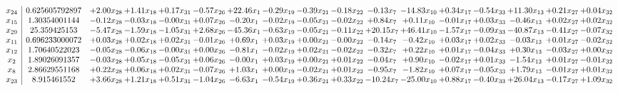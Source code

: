 \documentclass[9pt]{article}
\begin{document}
 \[\begin{array}{c| c c@{\hskip 2pt} c@{\hskip 2pt} c@{\hskip 2pt} c@{\hskip 2pt} c@{\hskip 2pt} c@{\hskip 2pt} c@{\hskip 2pt} c@{\hskip 2pt} c@{\hskip 2pt} c@{\hskip 2pt} c@{\hskip 2pt} c@{\hskip 2pt} c@{\hskip 2pt} c@{\hskip 2pt} c@{\hskip 2pt} }
 x_{24}   &  0.625605792897 & +  2.00 x_{28} & +  1.41 x_{18} & +  0.17 x_{31} & -0.57 x_{26} & + 22.46 x_{1} & -0.29 x_{19} & -0.39 x_{21} & -0.18 x_{22} & -0.13 x_{7} & -14.83 x_{10} & +  0.34 x_{17} & -0.54 x_{33} & + 11.30 x_{13} & +  0.21 x_{27} & +  0.04 x_{32}\\
 x_{15}   &  1.30354001144 & -0.12 x_{28} & -0.03 x_{18} & -0.00 x_{31} & +  0.07 x_{26} & -0.20 x_{1} & -0.02 x_{19} & -0.05 x_{21} & -0.02 x_{22} & +  0.84 x_{7} & +  0.11 x_{10} & -0.01 x_{17} & +  0.03 x_{33} & -0.46 x_{13} & +  0.02 x_{27} & +  0.02 x_{32}\\
 x_{29}   &  25.359425153 & -5.47 x_{28} & -1.59 x_{18} & -1.05 x_{31} & +  2.68 x_{26} & -45.36 x_{1} & -0.63 x_{19} & -0.05 x_{21} & -0.11 x_{22} & + 20.15 x_{7} & + 46.41 x_{10} & -1.57 x_{17} & -0.09 x_{33} & -40.87 x_{13} & -0.41 x_{27} & -0.07 x_{32}\\
 x_{11}   &  0.696233000072 & +  0.03 x_{28} & +  0.02 x_{18} & +  0.02 x_{31} & -0.01 x_{26} & +  0.69 x_{1} & +  0.03 x_{19} & +  0.00 x_{21} & -0.00 x_{22} & -0.14 x_{7} & -0.42 x_{10} & +  0.03 x_{17} & +  0.02 x_{33} & -0.03 x_{13} & +  0.01 x_{27} & -0.02 x_{32}\\
 x_{12}   &  1.70640522023 & -0.05 x_{28} & -0.06 x_{18} & -0.00 x_{31} & +  0.00 x_{26} & -0.81 x_{1} & -0.02 x_{19} & +  0.02 x_{21} & -0.02 x_{22} & -0.32 x_{7} & +  0.22 x_{10} & +  0.01 x_{17} & -0.04 x_{33} & +  0.30 x_{13} & -0.03 x_{27} & +  0.00 x_{32}\\
 x_{2}   &  1.89026091357 & -0.03 x_{28} & +  0.05 x_{18} & -0.05 x_{31} & +  0.06 x_{26} & -0.00 x_{1} & +  0.03 x_{19} & +  0.00 x_{21} & +  0.01 x_{22} & -0.04 x_{7} & +  0.90 x_{10} & -0.02 x_{17} & +  0.01 x_{33} & -1.54 x_{13} & +  0.01 x_{27} & -0.01 x_{32}\\
 x_{8}   &  2.86629551168 & +  0.22 x_{28} & +  0.06 x_{18} & +  0.02 x_{31} & -0.07 x_{26} & +  1.03 x_{1} & +  0.00 x_{19} & -0.02 x_{21} & +  0.01 x_{22} & -0.95 x_{7} & -1.82 x_{10} & +  0.07 x_{17} & -0.05 x_{33} & +  1.79 x_{13} & -0.01 x_{27} & +  0.01 x_{32}\\
 x_{23}   &  8.915461552 & +  3.66 x_{28} & +  1.21 x_{18} & +  0.51 x_{31} & -1.04 x_{26} & -6.63 x_{1} & -0.54 x_{19} & +  0.36 x_{21} & +  0.33 x_{22} & -10.24 x_{7} & -25.00 x_{10} & +  0.88 x_{17} & -0.40 x_{33} & + 26.04 x_{13} & -0.17 x_{27} & +  1.09 x_{32}\\

\end{array}\]
\end{document}
